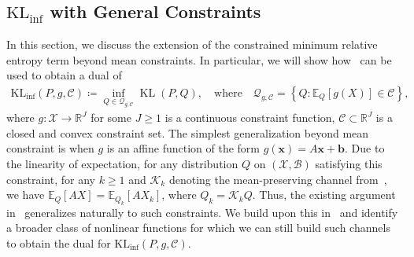 \documentclass{article}
\theoremstyle{plain}
\theoremstyle{definition}
\newcommand{\KLinf}{\operatorname{KL_{inf}}}
\newcommand{\KL}{\operatorname{KL}}
\newcommand{\R}{\mathbb{R}}
\newcommand{\calC}{\mathcal C}
\newcommand{\calQ}{\mathcal Q}
\newcommand{\calX}{\mathcal X}
\newcommand{\calB}{\mathcal B}
\newcommand{\calK}{\mathcal{K}}
\newcommand{\xvec}{\mathbf{x}}
\newcommand{\qtext}[1]{\quad \text{#1} \quad}
\begin{document}
\subsection{$\KLinf$ with General Constraints}
\label{subsec:other-constraints}
In this section, we discuss the extension of the constrained minimum relative entropy term beyond mean constraints. 
In particular, we will show how~ can be used to obtain a dual of  
\begin{align}
    \KLinf(P, g, \calC) \coloneqq \inf_{Q \in \calQ_{g,\calC}} \KL(P, Q), \qtext{where} \calQ_{g, \calC} = \left\{ Q: \mathbb{E}_Q[g(X)]  \in \calC \right\},  \label{eq:general-constraint-1}
\end{align}
where $g: \calX \to \R^J$ for some $J \geq 1$ is a continuous constraint function,  $\calC \subset \R^J$ is a closed and convex constraint set. 
The simplest generalization beyond mean constraint is when $g$ is an affine function of the form $g(\xvec) = A \xvec +\mathbf{b}$. Due to the linearity of expectation, for any distribution $Q$ on $(\calX, \calB)$ satisfying this constraint, for any $k \geq 1$ and $\calK_k$ denoting the mean-preserving channel from~, we have $\mathbb{E}_{Q}[A X] = \mathbb{E}_{Q_k}[A X_k]$, where $Q_k = \calK_k Q$. Thus, the existing argument in~ generalizes naturally to such constraints. We build  upon this in~ and identify a broader class of nonlinear functions for which we can still build such channels to obtain the dual for $\KLinf(P, g, \calC)$. 
\end{document}
